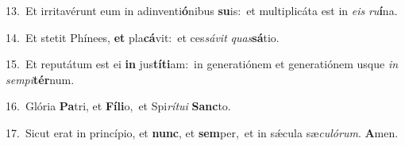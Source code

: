 {\numbfont\textcolor{\numbcolor}{13.}}~Et irritavérunt eum in adinventi\-\textbf{ó}\-nibus \textbf{su}\-is:~\star et multiplicáta est in \textit{e}\-\textit{is} \textit{ru}\-\textbf{í}na.\par
{\numbfont\textcolor{\numbcolor}{14.}}~Et stetit Phínees, \textbf{et} pla\-\textbf{cá}\-vit:~\star et ces\-\textit{sá}\-\textit{vit} \textit{quas}\-\textbf{sá}tio.\par
{\numbfont\textcolor{\numbcolor}{15.}}~Et reputátum est ei \textbf{in} jus\-\textbf{tí}\-\textbf{ti}am:~\star in generatiónem et generatiónem usque \textit{in} \textit{sem}\-\textit{pi}\textbf{tér}num.\par
{\numbfont\textcolor{\numbcolor}{16.}}~Glória \textbf{Pa}\-tri, et \textbf{Fí}\-\textbf{li}o,~\star et Spi\-\textit{rí}\-\textit{tu}\textit{i} \textbf{Sanc}\-to.\par
{\numbfont\textcolor{\numbcolor}{17.}}~Sicut erat in princípio, et \textbf{nunc}\-, et \textbf{sem}\-per,~\star et in sǽcula sæ\-\textit{cu}\-\textit{ló}\textit{rum}. \textbf{A}\-men.\par
